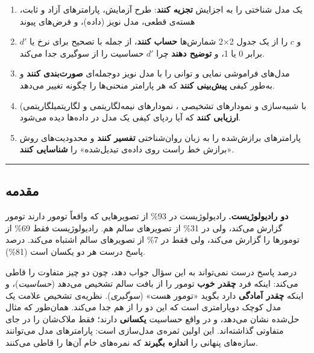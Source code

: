 \begin{enumerate}
\def\labelenumi{\arabic{enumi}.}
\tightlist
\item
  یک مدل شناختی را به اجزایش \textbf{تجزیه کنند}: طرح آزمایش، پارامترهای
  آزاد و ثابت، هسته‌ی قطعی، مدل نویز (داده)، و فرض‌های پیوند 
\item
  \(d'\) و \(c\) را از یک جدول 2×2 شمارش‌ها \textbf{حساب کنند}، از جمله
  با تصحیح برای نرخ  یا  برابر 0 یا 1، و
  \textbf{توضیح دهند} چرا \(d'\) حساسیت را از سوگیری جدا می‌کند.
\item
  مدل‌های فراموشی نمایی و توانی را با مدل نویز دوجمله‌ای \textbf{صورت‌بندی
  کنند} و به‌طور کیفی \textbf{پیش‌بینی کنند} که هر پارامتر منحنی‌ها را
  چگونه تغییر می‌دهد.
\item
  با شبیه‌سازی و نمودارهای تشخیصی ، نمودارهای نیمه‌لگاریتمی
  و لگاریتمی\lr{--}لگاریتمی) \textbf{ارزیابی کنند} که آیا ردپای کیفی یک مدل
  در داده‌ها دیده می‌شود.
\item
  پارامترهای برازش‌شده را به زبان روان‌شناختی \textbf{تفسیر کنند} و
  محدودیت‌های روش «برازش خط راست روی داده‌ی تبدیل‌شده» را \textbf{شناسایی
  کنند}.
\end{enumerate}

\begin{center}\rule{0.5\linewidth}{0.5pt}\end{center}

\subsection{مقدمه}

\textbf{دو رادیولوژیست.} رادیولوژیست  در 93\% از تصویرهایی که
واقعاً تومور دارند تومور گزارش می‌کند، ولی در 31\% از تصویرهای سالم هم.
رادیولوژیست  فقط 69\% از تومورها را گزارش می‌کند، ولی فقط در 7\%
از تصویرهای سالم اشتباه می‌کند. درصد پاسخ درست هر دو یکسان است (81\%).

درصد پاسخ درست نمی‌تواند به این سؤال جواب دهد، چون دو چیز متفاوت را قاطی
می‌کند: اینکه فرد \textbf{چقدر خوب} تومور را از بافت سالم تشخیص می‌دهد
(\emph{حساسیت})، و اینکه \textbf{چقدر آمادگی} دارد بگوید «تومور هست»
(\emph{سوگیری}). نظریه‌ی تشخیص علامت یک مدل کوچک دوپارامتری است که این دو
را از هم جدا می‌کند. همان‌طور که مثال حل‌شده نشان می‌دهد،  و 
در واقع حساسیت \textbf{یکسانی} دارند؛ فقط ملاک‌شان را در جای متفاوتی
گذاشته‌اند. این اولین ثمره‌ی مدل‌سازی است: پارامترهای مدل می‌توانند سازه‌های
پنهانی را \textbf{اندازه بگیرند} که نمره‌های خام آن‌ها را قاطی می‌کنند.

